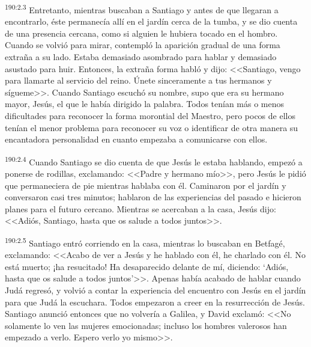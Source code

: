 \par 
\textsuperscript{190:2.3} Entretanto, mientras buscaban a Santiago y antes de que llegaran a encontrarlo, éste permanecía allí en el jardín cerca de la tumba, y se dio cuenta de una presencia cercana, como si alguien le hubiera tocado en el hombro. Cuando se volvió para mirar, contempló la aparición gradual de una forma extraña a su lado. Estaba demasiado asombrado para hablar y demasiado asustado para huir. Entonces, la extraña forma habló y dijo: <<Santiago, vengo para llamarte al servicio del reino. Únete sinceramente a tus hermanos y sígueme>>. Cuando Santiago escuchó su nombre, supo que era su hermano mayor, Jesús, el que le había dirigido la palabra. Todos tenían más o menos dificultades para reconocer la forma morontial del Maestro, pero pocos de ellos tenían el menor problema para reconocer su voz o identificar de otra manera su encantadora personalidad en cuanto empezaba a comunicarse con ellos.

\par 
\textsuperscript{190:2.4} Cuando Santiago se dio cuenta de que Jesús le estaba hablando, empezó a ponerse de rodillas, exclamando: <<Padre y hermano mío>>, pero Jesús le pidió que permaneciera de pie mientras hablaba con él. Caminaron por el jardín y conversaron casi tres minutos; hablaron de las experiencias del pasado e hicieron planes para el futuro cercano. Mientras se acercaban a la casa, Jesús dijo: <<Adiós, Santiago, hasta que os salude a todos juntos>>.

\par 
\textsuperscript{190:2.5} Santiago entró corriendo en la casa, mientras lo buscaban en Betfagé, exclamando: <<Acabo de ver a Jesús y he hablado con él, he charlado con él. No está muerto; ¡ha resucitado! Ha desaparecido delante de mí, diciendo: `Adiós, hasta que os salude a todos juntos'>>. Apenas había acabado de hablar cuando Judá regresó, y volvió a contar la experiencia del encuentro con Jesús en el jardín para que Judá la escuchara. Todos empezaron a creer en la resurrección de Jesús. Santiago anunció entonces que no volvería a Galilea, y David exclamó: <<No solamente lo ven las mujeres emocionadas; incluso los hombres valerosos han empezado a verlo. Espero verlo yo mismo>>.

